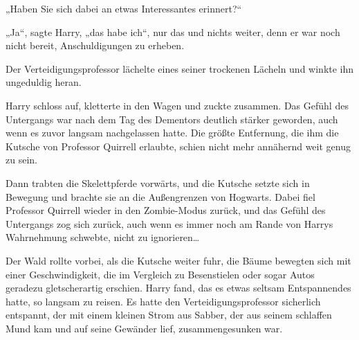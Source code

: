 „Haben Sie sich dabei an etwas Interessantes erinnert?“

„Ja“, sagte Harry, „das habe ich“, nur das und nichts weiter, denn er war noch nicht bereit, Anschuldigungen zu erheben.

Der Verteidigungsprofessor lächelte eines seiner trockenen Lächeln und winkte ihn ungeduldig heran.

Harry schloss auf, kletterte in den Wagen und zuckte zusammen. Das Gefühl des Untergangs war nach dem Tag des Dementors deutlich stärker geworden, auch wenn es zuvor langsam nachgelassen hatte. Die größte Entfernung, die ihm die Kutsche von Professor Quirrell erlaubte, schien nicht mehr annähernd weit genug zu sein.

Dann trabten die Skelettpferde vorwärts, und die Kutsche setzte sich in Bewegung und brachte sie an die Außengrenzen von Hogwarts. Dabei fiel Professor Quirrell wieder in den Zombie-Modus zurück, und das Gefühl des Untergangs zog sich zurück, auch wenn es immer noch am Rande von Harrys Wahrnehmung schwebte, nicht zu ignorieren…

Der Wald rollte vorbei, als die Kutsche weiter fuhr, die Bäume bewegten sich mit einer Geschwindigkeit, die im Vergleich zu Besenstielen oder sogar Autos geradezu gletscherartig erschien. Harry fand, das es etwas seltsam Entspannendes hatte, so langsam zu reisen. Es hatte den Verteidigungsprofessor sicherlich entspannt, der mit einem kleinen Strom aus Sabber, der aus seinem schlaffen Mund kam und auf seine Gewänder lief, zusammengesunken war.

